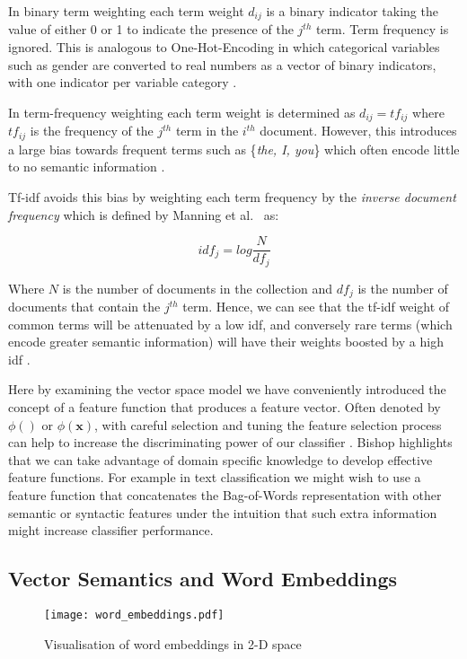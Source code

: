 \documentclass[Dissertation.tex]{subfiles}
\begin{document}
In binary term weighting each term weight $ d_{ij} $ is a binary indicator taking the value of either 0 or 1 to indicate the presence of the $ j^{th} $ term. Term frequency is ignored. This is analogous to One-Hot-Encoding in which categorical variables such as gender are converted to real numbers as a vector of binary indicators, with one indicator per variable category \cite{geronHandsonMachineLearning2017}.

In term-frequency weighting each term weight is determined as $d_{ij} = tf_{ij}$ where $tf_{ij}$ is the frequency of the $ j^{th}$ term in the $i^{th}$ document. However, this introduces a large bias towards frequent terms such as \{\textit{the, I, you}\} which often encode little to no semantic information \cite{manningIntroductionInformationRetrieval2009}.

Tf-idf avoids this bias by weighting each term frequency by the \textit{inverse document frequency} which is defined by Manning et al.\ \cite{manningIntroductionInformationRetrieval2009} as:

$$idf_j = log \frac{N}{df_j} $$

Where $ N $ is the number of documents in the collection and $ df_j $ is the number of documents that contain the $ j^{th} $ term. Hence, we can see that the tf-idf weight of common terms will be attenuated by a low idf, and conversely rare terms (which encode greater semantic information) will have their weights boosted by a high idf \cite{manningIntroductionInformationRetrieval2009}.

Here by examining the vector space model we have conveniently introduced the concept of a feature function that produces a feature vector. Often denoted by $ \phi() $ or $ \phi(\mathbf{x}) $,  with careful selection and tuning the feature selection process can help to increase the discriminating power of our classifier \cite{bishopPatternRecognitionMachine2006}. Bishop \cite{bishopPatternRecognitionMachine2006} highlights that we can take advantage of domain specific knowledge to develop effective feature functions. For example in text classification we might wish to use a feature function that concatenates the Bag-of-Words representation with other semantic or syntactic features under the intuition that such extra information might increase classifier performance. 

\subsection{Vector Semantics and Word Embeddings}
\begin{figure}[h]
	\centering
	\texttt{[image: word\_embeddings.pdf]}
	\caption{Visualisation of word embeddings in 2-D
		\label{fig:wordEmbeds} space}
\end{figure}
\end{document}

